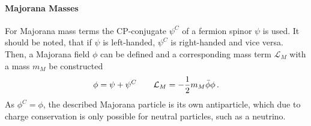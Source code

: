 \paragraph{Majorana Masses}
For Majorana mass terms the CP-conjugate $\psi^C$ of a fermion spinor $\psi$ is used. It should be noted, that if $\psi$ is left-handed, $\psi^C$ is right-handed and vice versa. Then, a Majorana field $\phi$ can be defined and a corresponding mass term $\mathcal{L}_M$ with a mass $m_M$ be constructed~\cite{zuber2011neutrino}
\begin{equation}
\phi = \psi + \psi^C \qquad \mathcal{L}_M = -\frac{1}{2}m_M \bar\phi \phi \text{\,.}
\end{equation}
As $\phi^C=\phi$, the described Majorana particle is its own antiparticle, which due to charge conservation is only possible for neutral particles, such as a neutrino.

